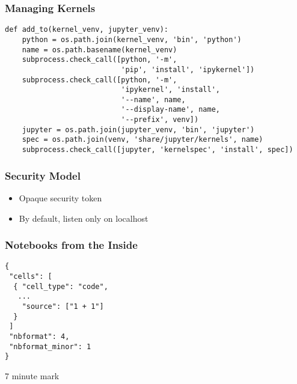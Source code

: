 \begin{frame}[fragile]
\frametitle{Managing Kernels}

\begin{lstlisting}
def add_to(kernel_venv, jupyter_venv):
    python = os.path.join(kernel_venv, 'bin', 'python')
    name = os.path.basename(kernel_venv)
    subprocess.check_call([python, '-m',
                           'pip', 'install', 'ipykernel'])
    subprocess.check_call([python, '-m',
                           'ipykernel', 'install',
                           '--name', name,
                           '--display-name', name,
                           '--prefix', venv])
    jupyter = os.path.join(jupyter_venv, 'bin', 'jupyter')
    spec = os.path.join(venv, 'share/jupyter/kernels', name)
    subprocess.check_call([jupyter, 'kernelspec', 'install', spec])
\end{lstlisting}
\end{frame}

\begin{frame}
\frametitle{Security Model}

\begin{itemize}
\item Opaque security token
\item By default, listen only on localhost
\end{itemize}

\end{frame}


\begin{frame}[fragile]
\frametitle{Notebooks from the Inside}

\begin{lstlisting}
{
 "cells": [
  { "cell_type": "code",
   ...
    "source": ["1 + 1"]
  }
 ]
 "nbformat": 4,
 "nbformat_minor": 1
}
\end{lstlisting}

\end{frame}

7 minute mark


